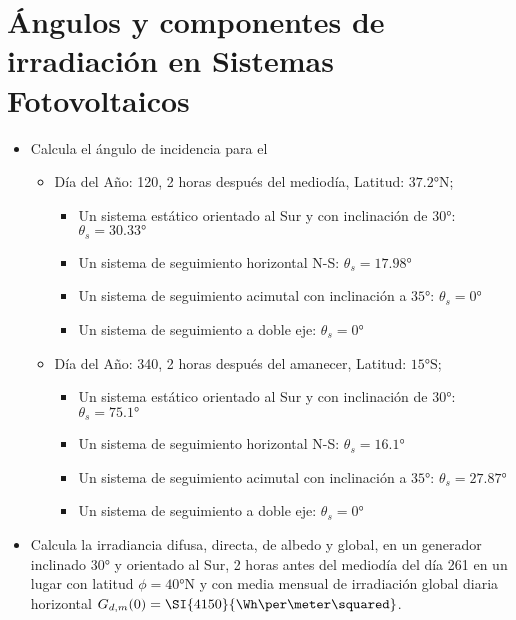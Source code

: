 \section{Ángulos y componentes de irradiación en Sistemas
  Fotovoltaicos}

\begin{itemize}
\item Calcula el ángulo de incidencia para el
  \begin{itemize}
  \item Día del Año: 120, 2 horas después del mediodía, Latitud:
    $\ang{37.2}\mathrm{N}$;

    \begin{itemize}
    \item Un sistema estático orientado al Sur y con inclinación de
      $\ang{30}$: $\theta_{s}=\ang{30.33}$
    \item Un sistema de seguimiento horizontal N-S:
      $\theta_{s}=\ang{17.98}$
    \item Un sistema de seguimiento acimutal con inclinación a
      $\ang{35}$: $\theta_{s}=\ang{0}$
    \item Un sistema de seguimiento a doble eje: $\theta_{s}=\ang{0}$
    \end{itemize}
  \item Día del Año: 340, 2 horas después del amanecer, Latitud:
    $\ang{15}\mathrm{S}$;

    \begin{itemize}
    \item Un sistema estático orientado al Sur y con inclinación de
      $\ang{30}$: $\theta_{s}=\ang{75.1}$
    \item Un sistema de seguimiento horizontal N-S:
      $\theta_{s}=\ang{16.1}$
    \item Un sistema de seguimiento acimutal con inclinación a
      $\ang{35}$: $\theta_{s}=\ang{27.87}$
    \item Un sistema de seguimiento a doble eje: $\theta_{s}=\ang{0}$
    \end{itemize}
  \end{itemize}


\item Calcula la irradiancia difusa, directa, de albedo y global, en
  un generador inclinado $\ang{30}$ y orientado al Sur, 2 horas antes
  del mediodía del día 261 en un lugar con latitud
  $\phi=\ang{40}\mathrm{N}$ y con media mensual de irradiación global
  diaria horizontal $G_{d,m}(0)=\SI{4150}{\Wh\per\meter\squared}$.


\end{itemize}
